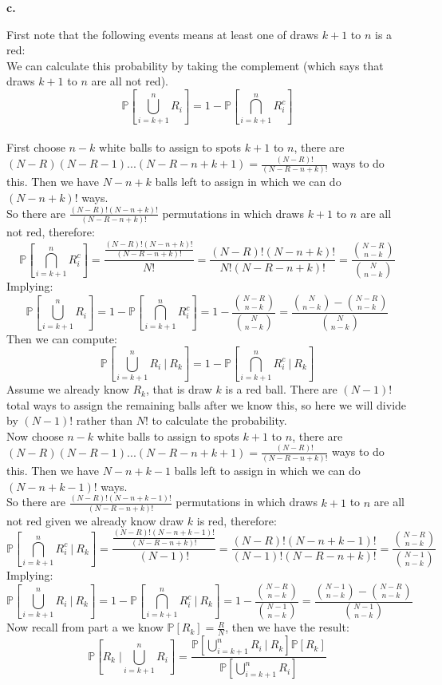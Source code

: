 \documentclass{article}
\begin{document}
{\Large\textbf{c.}}
\begin{center}
\doublespacing
    First note that the following events means at least one of draws $k+1$ to $n$ is a red:
    \\We can calculate this probability by taking the complement (which says that draws $k+1$ to $n$ are all not red).
    \[\mathbb{P}[\bigcup_{i=k+1}^n R_i] = 1 -\mathbb{P}[\bigcap_{i=k+1}^n R_i^c]\]
    \\First choose $n - k$ white balls to assign to spots $k+1$ to $n$, there are $(N-R)(N-R-1)...(N-R-n+k+1) =\frac{(N-R)!}{(N-R-n+k)!}$ ways to do this. Then we have $N - n + k$ balls left to assign in which we can do $(N-n+k)!$ ways.
    \\So there are $\frac{(N-R)!(N-n+k)!}{(N-R-n+k)!}$ permutations in which draws $k+1$ to $n$ are all not red, therefore:
    \[\mathbb{P}[\bigcap_{i=k+1}^n R_i^c] =\frac{\frac{(N-R)!(N-n+k)!}{(N-R-n+k)!}}{N!} =\frac{(N-R)!(N-n+k)!}{N!(N-R-n+k)!} =\frac{\binom{N-R}{n-k}}{\binom{N}{n-k}}\]
    Implying:
    \[\mathbb{P}[\bigcup_{i=k+1}^n R_i] = 1 -\mathbb{P}[\bigcap_{i=k+1}^n R_i^c] = 1 -\frac{\binom{N-R}{n-k}}{\binom{N}{n-k}} =\frac{\binom{N}{n-k} -\binom{N-R}{n-k}}{\binom{N}{n-k}}\]
    Then we can compute:
    \[\mathbb{P}[\bigcup_{i=k+1}^n R_i\:|\:R_k] = 1 -\mathbb{P}[\bigcap_{i=k+1}^n R_i^c\:|\:R_k]\]
    Assume we already know $R_k$, that is draw $k$ is a red ball. There are $(N-1)!$ total ways to assign the remaining balls after we know this, so here we will divide by $(N-1)!$ rather than $N!$ to calculate the probability.
    \\Now choose $n - k$ white balls to assign to spots $k+1$ to $n$, there are $(N-R)(N-R-1)...(N-R-n+k+1) =\frac{(N-R)!}{(N-R-n+k)!}$ ways to do this. Then we have $N - n + k - 1$ balls left to assign in which we can do $(N-n+k-1)!$ ways.
    \\So there are $\frac{(N-R)!(N-n+k-1)!}{(N-R-n+k)!}$ permutations in which draws $k+1$ to $n$ are all not red given we already know draw $k$ is red, therefore:
    \[\mathbb{P}[\bigcap_{i=k+1}^n R_i^c\:|\:R_k] =\frac{\frac{(N-R)!(N-n+k-1)!}{(N-R-n+k)!}}{(N-1)!} =\frac{(N-R)!(N-n+k-1)!}{(N-1)!(N-R-n+k)!} =\frac{\binom{N-R}{n-k}}{\binom{N-1}{n-k}}\]
    Implying:
    \[\mathbb{P}[\bigcup_{i=k+1}^n R_i\:|\:R_k] = 1 -\mathbb{P}[\bigcap_{i=k+1}^n R_i^c\:|\:R_k] = 1 -\frac{\binom{N-R}{n-k}}{\binom{N-1}{n-k}} =\frac{\binom{N-1}{n-k} -\binom{N-R}{n-k}}{\binom{N-1}{n-k}}\]
    Now recall from part a we know $\mathbb{P}[R_k] =\frac{R}{N}$, then we have the result:
    \[\mathbb{P}[R_k\;|\bigcup_{i=k+1}^n R_i] =\frac{\mathbb{P}[\bigcup_{i=k+1}^n R_i\:|\:R_k]\mathbb{P}[R_k]}{\mathbb{P}[\bigcup_{i=k+1}^n R_i]}\]

\end{center}
\end{document}
